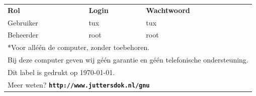 \documentclass[a4paper,14pt]{extarticle}
\begin{document}
\begin{center}
\begin{tabular}{ p{4cm} p{4cm}l }
	\textbf{Rol}       & \textbf{Login} & \textbf{Wachtwoord}                     \\
	Gebruiker          & tux            & tux                                     \\
	Beheerder          & root					  & root                                    \\[2em]
	\multicolumn{3}{l}{*Voor all\'e\'en de computer, zonder toebehoren.}          \\
	\multicolumn{3}{l}{Bij deze computer geven wij g\'e\'en garantie en g\'e\'en telefonische ondersteuning.}\\
  \multicolumn{3}{l}{Dit label is gedrukt op \today.}\\[1.5em]
	\multicolumn{3}{l}{Meer weten? \textbf{\texttt{http://www.juttersdok.nl/gnu}}}\\
\end{tabular}
\end{center}
\end{document}
